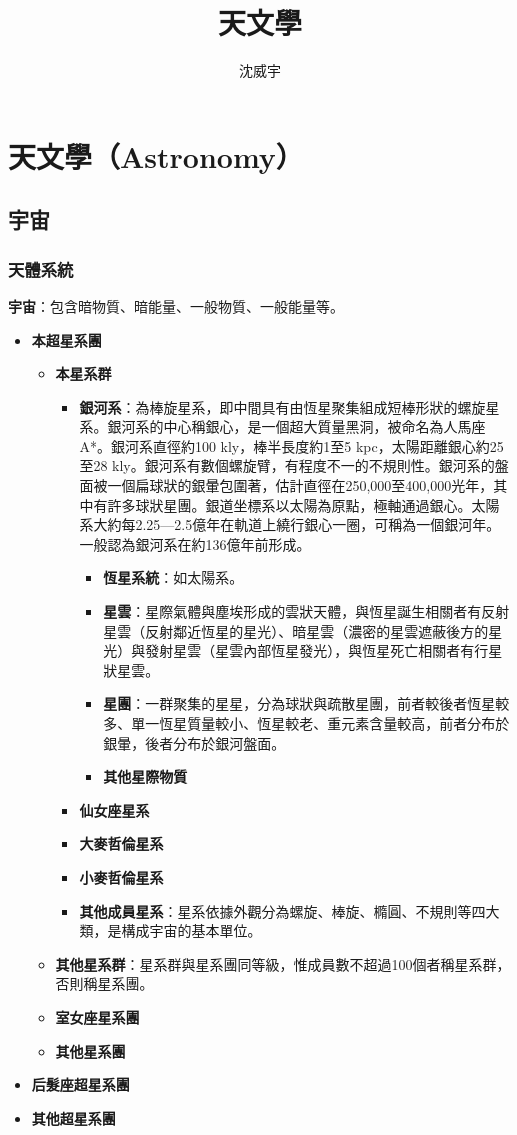 \documentclass[a4paper,12pt]{report}
\begin{document}
\title{天文學}
\author{沈威宇}
\date{\temtoday}
\titletocdoc
\chapter{天文學（Astronomy）}
\section{宇宙}
\subsection{天體系統}
\textbf{宇宙}：包含暗物質、暗能量、一般物質、一般能量等。
\begin{itemize}
\item \textbf{本超星系團}
\begin{itemize}
\item \textbf{本星系群}
\begin{itemize}
\item \textbf{銀河系}：為棒旋星系，即中間具有由恆星聚集組成短棒形狀的螺旋星系。銀河系的中心稱銀心，是一個超大質量黑洞，被命名為人馬座A*。銀河系直徑約100 kly，棒半長度約1至5 kpc，太陽距離銀心約25至28 kly。銀河系有數個螺旋臂，有程度不一的不規則性。銀河系的盤面被一個扁球狀的銀暈包圍著，估計直徑在250,000至400,000光年，其中有許多球狀星團。銀道坐標系以太陽為原點，極軸通過銀心。太陽系大約每2.25—2.5億年在軌道上繞行銀心一圈，可稱為一個銀河年。一般認為銀河系在約136億年前形成。
\begin{itemize}
\item \textbf{恆星系統}：如太陽系。
\item \textbf{星雲}：星際氣體與塵埃形成的雲狀天體，與恆星誕生相關者有反射星雲（反射鄰近恆星的星光）、暗星雲（濃密的星雲遮蔽後方的星光）與發射星雲（星雲內部恆星發光），與恆星死亡相關者有行星狀星雲。
\item \textbf{星團}：一群聚集的星星，分為球狀與疏散星團，前者較後者恆星較多、單一恆星質量較小、恆星較老、重元素含量較高，前者分布於銀暈，後者分布於銀河盤面。
\item\textbf{其他星際物質}
\end{itemize}
\item \textbf{仙女座星系}
\item \textbf{大麥哲倫星系}
\item \textbf{小麥哲倫星系}
\item \textbf{其他成員星系}：星系依據外觀分為螺旋、棒旋、橢圓、不規則等四大類，是構成宇宙的基本單位。
\end{itemize}
\item \textbf{其他星系群}：星系群與星系團同等級，惟成員數不超過100個者稱星系群，否則稱星系團。
\item \textbf{室女座星系團}
\item \textbf{其他星系團}
\end{itemize}
\item \textbf{后髮座超星系團}
\item \textbf{其他超星系團}
\end{itemize}
\end{document}
